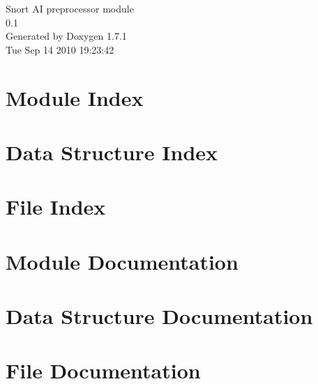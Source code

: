 \documentclass[a4paper]{book}
\begin{document}
\hypersetup{pageanchor=false}
\begin{titlepage}
\vspace*{7cm}
\begin{center}
{\Large Snort AI preprocessor module \\[1ex]\large 0.1 }\\
\vspace*{1cm}
{\large Generated by Doxygen 1.7.1}\\
\vspace*{0.5cm}
{\small Tue Sep 14 2010 19:23:42}\\
\end{center}
\end{titlepage}
\clearemptydoublepage
{}
\tableofcontents
\clearemptydoublepage
{}
\hypersetup{pageanchor=true}
\chapter{Module Index}

\chapter{Data Structure Index}

\chapter{File Index}

\chapter{Module Documentation}






\chapter{Data Structure Documentation}











\chapter{File Documentation}











\printindex
\end{document}
